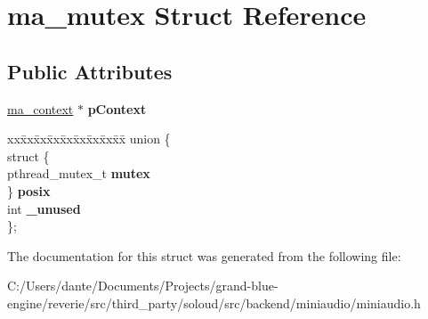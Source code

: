 \hypertarget{structma__mutex}{}\section{ma\+\_\+mutex Struct Reference}
\label{structma__mutex}
\subsection*{Public Attributes}
\begin{DoxyCompactItemize}
\item 
\mbox{\label{structma__mutex_a66066ed5e8ff9f5a00c420e149c54cfc}} 
\mbox{\hyperlink{structma__context}{ma\+\_\+context}} $\ast$ {\bfseries p\+Context}
\item 
\mbox{\label{structma__mutex_a2c026d453a41055c51625b87a3bfc54a}} 
\begin{tabbing}
xx\=xx\=xx\=xx\=xx\=xx\=xx\=xx\=xx\=\kill
union \{\\
\>struct \{\\
\>\>pthread\_mutex\_t {\bfseries mutex}\\
\>\} {\bfseries posix}\\
\>int {\bfseries \_unused}\\
\}; \\

\end{tabbing}\end{DoxyCompactItemize}


The documentation for this struct was generated from the following file\+:\begin{DoxyCompactItemize}
\item 
C\+:/\+Users/dante/\+Documents/\+Projects/grand-\/blue-\/engine/reverie/src/third\+\_\+party/soloud/src/backend/miniaudio/miniaudio.\+h\end{DoxyCompactItemize}
